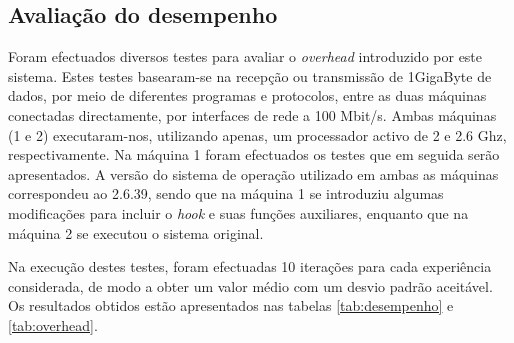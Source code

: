 \documentclass[a4paper]{llncs}
\begin{document}
\subsection{Avaliação do desempenho}
Foram efectuados diversos testes para avaliar o \emph{overhead} introduzido por este sistema.
 Estes testes basearam-se na recepção ou transmissão de 1GigaByte de dados, por meio de diferentes programas e protocolos, entre as duas máquinas conectadas directamente, por interfaces de rede a 100 Mbit/s.
 Ambas máquinas (1 e 2) executaram-nos, utilizando apenas, um processador activo de 2 e 2.6 Ghz, respectivamente.
 Na máquina 1 foram efectuados os testes que em seguida serão apresentados.
 A versão do sistema de operação utilizado em ambas as máquinas correspondeu ao 2.6.39, sendo que na máquina 1 se introduziu algumas modificações para incluir o \textit{hook} e suas funções auxiliares, enquanto que na máquina 2 se executou o sistema original.

Na execução destes testes, foram efectuadas 10 iterações para cada experiência considerada, de modo a obter um valor médio com um desvio padrão aceitável.
 Os resultados obtidos estão apresentados nas tabelas \ref{tab:desempenho} e \ref{tab:overhead}.
\end{document}
